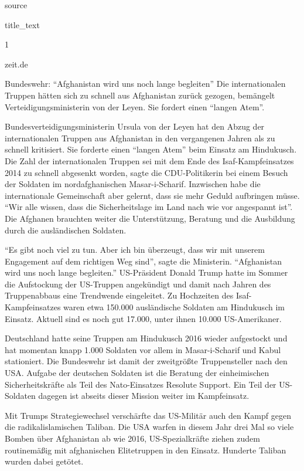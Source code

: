 \documentclass[]{article}
\begin{document}
source

title\_text

1

zeit.de

Bundeswehr: ``Afghanistan wird uns noch lange begleiten'' Die
internationalen Truppen hätten sich zu schnell aus Afghanistan zurück
gezogen, bemängelt Verteidigungsministerin von der Leyen. Sie fordert
einen ``langen Atem''.

Bundesverteidigungsministerin Ursula von der Leyen hat den Abzug der
internationalen Truppen aus Afghanistan in den vergangenen Jahren als zu
schnell kritisiert. Sie forderte einen ``langen Atem'' beim Einsatz am
Hindukusch. Die Zahl der internationalen Truppen sei mit dem Ende des
Isaf-Kampfeinsatzes 2014 zu schnell abgesenkt worden, sagte die
CDU-Politikerin bei einem Besuch der Soldaten im nordafghanischen
Masar-i-Scharif. Inzwischen habe die internationale Gemeinschaft aber
gelernt, dass sie mehr Geduld aufbringen müsse. ``Wir alle wissen, dass
die Sicherheitslage im Land nach wie vor angespannt ist''. Die Afghanen
brauchten weiter die Unterstützung, Beratung und die Ausbildung durch
die ausländischen Soldaten.

``Es gibt noch viel zu tun. Aber ich bin überzeugt, dass wir mit unserem
Engagement auf dem richtigen Weg sind'', sagte die Ministerin.
``Afghanistan wird uns noch lange begleiten.'' US-Präsident Donald Trump
hatte im Sommer die Aufstockung der US-Truppen angekündigt und damit
nach Jahren des Truppenabbaus eine Trendwende eingeleitet. Zu Hochzeiten
des Isaf-Kampfeinsatzes waren etwa 150.000 ausländische Soldaten am
Hindukusch im Einsatz. Aktuell sind es noch gut 17.000, unter ihnen
10.000 US-Amerikaner.

Deutschland hatte seine Truppen am Hindukusch 2016 wieder aufgestockt
und hat momentan knapp 1.000 Soldaten vor allem in Masar-i-Scharif und
Kabul stationiert. Die Bundeswehr ist damit der zweitgrößte
Truppensteller nach den USA. Aufgabe der deutschen Soldaten ist die
Beratung der einheimischen Sicherheitskräfte als Teil des Nato-Einsatzes
Resolute Support. Ein Teil der US-Soldaten dagegen ist abseits dieser
Mission weiter im Kampfeinsatz.

Mit Trumps Strategiewechsel verschärfte das US-Militär auch den Kampf
gegen die radikalislamischen Taliban. Die USA warfen in diesem Jahr drei
Mal so viele Bomben über Afghanistan ab wie 2016, US-Spezialkräfte
ziehen zudem routinemäßig mit afghanischen Elitetruppen in den Einsatz.
Hunderte Taliban wurden dabei getötet.
\end{document}
